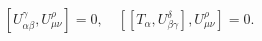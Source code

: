\begin{equation}\label{4.36}
[U^\gamma_{\alpha\beta},U^\rho_{\mu\nu}]=0,\quad
[[T_\alpha,U^\delta_{\beta\gamma}],U^\rho_{\mu\nu}]=0.
\end{equation}

